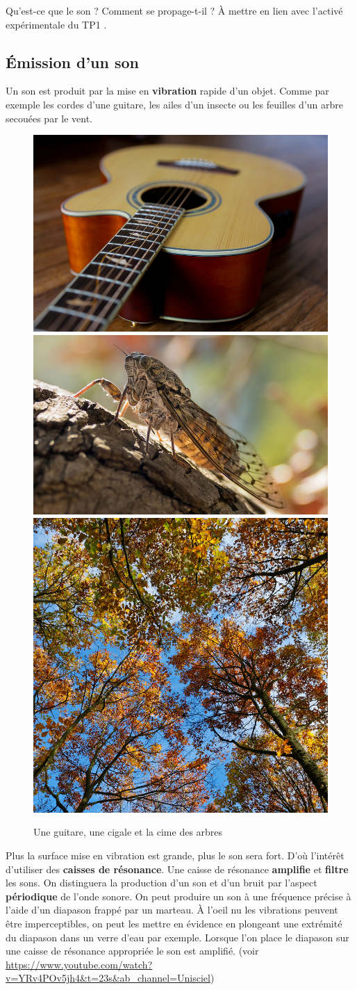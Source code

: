 \documentclass[french]{article}
\begin{document}
Qu'est-ce que le son ? Comment se propage-t-il ? À mettre en lien avec l'activé expérimentale du TP1
.



\subsection{Émission d'un son}

Un son est produit par la mise en \textbf{vibration} rapide d'un objet. Comme par exemple les cordes d'une guitare, les ailes d'un insecte ou les feuilles d'un arbre secouées par le vent. 

\begin{figure}[ht!]
	\centering
	\includegraphics[width=.25\textwidth]{./figures/guitare.jpg}\hfill
	\includegraphics[width=.28\textwidth]{./figures/cigale.jpg}\hfill
	\includegraphics[width=.15\textwidth]{./figures/cimearbres.jpg}
	\caption{Une guitare, une cigale et la cime des arbres}
\end{figure}

Plus la surface mise en vibration est grande, plus le son sera fort. D'où l'intérêt d'utiliser des \textbf{caisses de résonance}. Une caisse de résonance \textbf{amplifie} et \textbf{filtre} les sons. On distinguera la production d'un son et d'un bruit par l'aspect \textbf{périodique} de l'onde sonore. On peut produire un son à une fréquence précise à l'aide d'un diapason frappé par un marteau. À l'oeil nu les vibrations peuvent être imperceptibles, on peut les mettre en évidence en plongeant une extrémité du diapason dans un verre d'eau par exemple. Lorsque l'on place le diapason sur une caisse de résonance appropriée le son est amplifié. (voir \url{https://www.youtube.com/watch?v=YRv4POv5jh4&t=23s&ab_channel=Unisciel})
\end{document}
